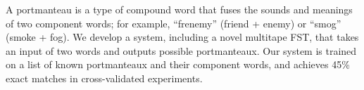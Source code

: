 A portmanteau is a type of compound word that fuses the sounds and meanings of two component words; for example, ``frenemy'' (friend + enemy) or ``smog'' (smoke + fog). We develop a system, including a novel multitape FST, that takes an input of two words and outputs possible portmanteaux. Our system is trained on a list of known portmanteaux and their component words, and achieves 45\% exact matches in cross-validated experiments.
